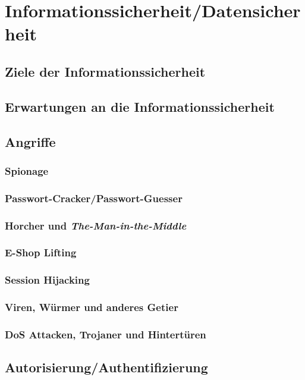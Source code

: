 \section{Informationssicherheit/Datensicherheit}

\subsection{Ziele der Informationssicherheit}

\subsection{Erwartungen an die Informationssicherheit}

\subsection{Angriffe}
\subsubsection*{Spionage}
\subsubsection*{Passwort-Cracker/Passwort-Guesser}
\subsubsection*{Horcher und \emph{The-Man-in-the-Middle}}
\subsubsection*{E-Shop Lifting}
\subsubsection*{Session Hijacking}
\subsubsection*{Viren, Würmer und anderes Getier}
\subsubsection*{DoS Attacken, Trojaner und Hintertüren}

\subsection{Autorisierung/Authentifizierung}

